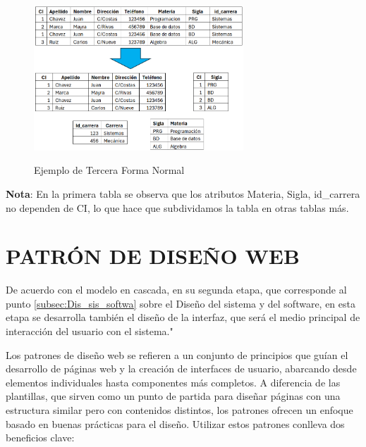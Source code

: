 		\begin{figure}[!h] %
			\caption[Ejemplo Tercera Forma Normal]
			{\newline Ejemplo de Tercera Forma Normal} %
			\vspace{0.2cm}
			\centering
			\includegraphics[width=0.7\textwidth]{imagenes/normalizacion/3FN.png} %
			\vspace{0.3cm}
			\vspace{-0.6cm}
			\label{fig:figura_3FN} %
		\end{figure}
		\begin{adjustwidth}{1.27cm}{1.27cm}
			\textup{\textbf{Nota}: En la primera tabla se observa que los atributos Materia, Sigla, id\_carrera no dependen de CI, lo que hace que subdividamos la tabla en otras tablas más.}
		\end{adjustwidth}
		
	\section{PATRÓN DE DISEÑO WEB}
		De acuerdo con el modelo en cascada, en su segunda etapa, que corresponde al punto \ref{subsec:Dis_sis_softwa} sobre el Diseño del sistema y del software, en esta etapa se desarrolla también el diseño de la interfaz, que será el medio principal de interacción del usuario con el sistema."
		
		Los patrones de diseño web se refieren a un conjunto de principios que guían el desarrollo de páginas web y la creación de interfaces de usuario, abarcando desde elementos individuales hasta componentes más completos. A diferencia de las plantillas, que sirven como un punto de partida para diseñar páginas con una estructura similar pero con contenidos distintos, los patrones ofrecen un enfoque basado en buenas prácticas para el diseño. Utilizar estos patrones conlleva dos beneficios clave:
		
